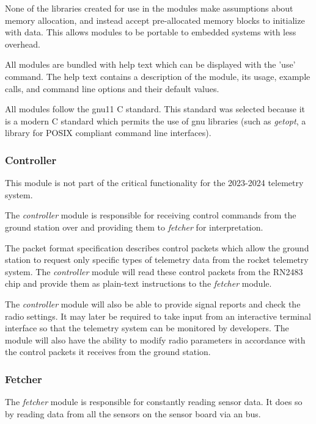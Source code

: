 None of the libraries created for use in the modules make assumptions about memory allocation, and instead accept
pre-allocated memory blocks to initialize with data. This allows modules to be portable to embedded systems with less
overhead.

All modules are bundled with help text which can be displayed with the 'use' command. The help text contains a
description of the module, its usage, example calls, and command line options and their default values.

All modules follow the gnu11 C standard. This standard was selected because it is a modern C standard which permits the
use of \gls{gnu} libraries (such as \textit{getopt}, a library for POSIX compliant command line interfaces).

\subsubsection{Controller}

This module is not part of the critical functionality for the 2023-2024  telemetry system.

The \textit{controller} module is responsible for receiving control commands from the ground station over
 and providing them to \textit{fetcher} for interpretation.

The  packet format specification describes control packets which allow the ground station to
request only specific types of telemetry data from the rocket telemetry system. The \textit{controller} module will
read these control packets from the  RN2483 chip and provide them as plain-text instructions to the
\textit{fetcher} module.

The \textit{controller} module will also be able to provide signal reports and check the  radio
settings. It may later be required to take input from an interactive terminal interface so that the telemetry system
can be monitored by developers. The module will also have the ability to modify radio parameters in accordance with the
control packets it receives from the ground station.

\subsubsection{Fetcher}

The \textit{fetcher} module is responsible for constantly reading sensor data. It does so by reading data from all the
sensors on the   sensor board via an  bus.

